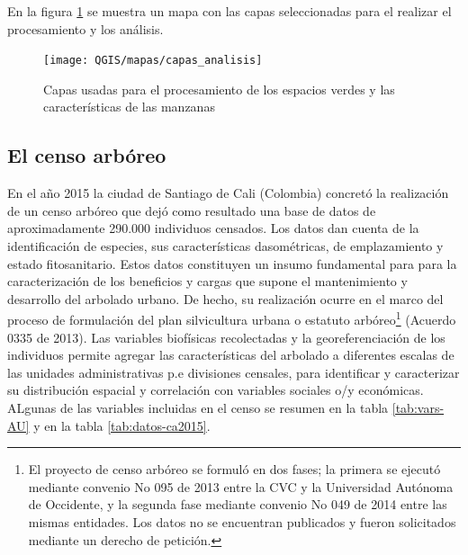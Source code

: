 \documentclass[12pt,]{book}
\let\rmarkdownfootnote\footnote%
\def\footnote{\protect\rmarkdownfootnote}
\begin{document}
En la figura \ref{fig:capas-idesc} se muestra un mapa con las capas
seleccionadas para el realizar el procesamiento y los análisis.

\begin{figure}
\texttt{[image: QGIS/mapas/capas\_analisis]} \caption{Capas usadas para el procesamiento de los espacios verdes y las características de las manzanas}\label{fig:capas-idesc}
\end{figure}

\subsection{El censo arbóreo}\label{el-censo-arboreo}

En el año 2015 la ciudad de Santiago de Cali (Colombia) concretó la
realización de un censo arbóreo que dejó como resultado una base de
datos de aproximadamente 290.000 individuos censados. Los datos dan
cuenta de la identificación de especies, sus características
dasométricas, de emplazamiento y estado fitosanitario. Estos datos
constituyen un insumo fundamental para para la caracterización de los
beneficios y cargas que supone el mantenimiento y desarrollo del
arbolado urbano. De hecho, su realización ocurre en el marco del proceso
de formulación del plan silvicultura urbana o estatuto arbóreo\footnote{El
  proyecto de censo arbóreo se formuló en dos fases; la primera se
  ejecutó mediante convenio No 095 de 2013 entre la CVC y la Universidad
  Autónoma de Occidente, y la segunda fase mediante convenio No 049 de
  2014 entre las mismas entidades. Los datos no se encuentran publicados
  y fueron solicitados mediante un derecho de petición.} (Acuerdo 0335
de 2013). Las variables biofísicas recolectadas y la georeferenciación
de los individuos permite agregar las características del arbolado a
diferentes escalas de las unidades administrativas p.e divisiones
censales, para identificar y caracterizar su distribución espacial y
correlación con variables sociales o/y económicas. ALgunas de las
variables incluidas en el censo se resumen en la tabla \ref{tab:vars-AU}
y en la tabla \ref{tab:datos-ca2015}.
\end{document}
